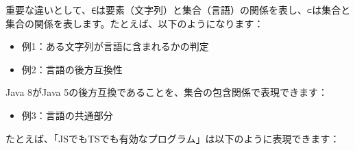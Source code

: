 重要な違いとして、\texttt{∈}は要素（文字列）と集合（言語）の関係を表し、\texttt{⊂}は集合と集合の関係を表します。たとえば、以下のようになります：

\begin{Shaded}
\begin{Highlighting}[]
\end{Highlighting}
\end{Shaded}

\begin{itemize}
\tightlist
\item
  例1：ある文字列が言語に含まれるかの判定
\end{itemize}

\begin{Shaded}
\begin{Highlighting}[]
\end{Highlighting}
\end{Shaded}

\begin{itemize}
\tightlist
\item
  例2：言語の後方互換性
\end{itemize}

Java 8がJava 5の後方互換であることを、集合の包含関係で表現できます：

\begin{Shaded}
\begin{Highlighting}[]
\end{Highlighting}
\end{Shaded}

\begin{itemize}
\tightlist
\item
  例3：言語の共通部分
\end{itemize}

たとえば、「JSでもTSでも有効なプログラム」は以下のように表現できます：

\begin{Shaded}
\begin{Highlighting}[]
\NormalTok{\}}
\end{Highlighting}
\end{Shaded}

